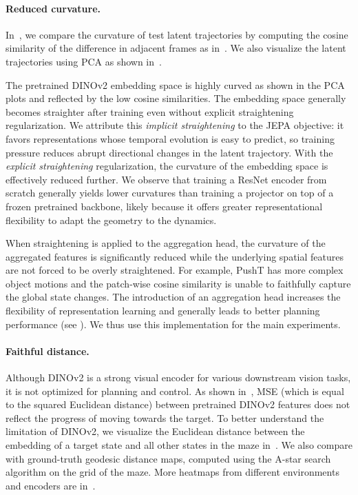 \paragraph{Reduced curvature.} In~, we compare the curvature of test latent trajectories by computing the cosine similarity of the difference in adjacent frames as in~. We also visualize the latent trajectories using PCA as shown in~. 

The pretrained DINOv2 embedding space is highly curved as shown in the PCA plots and reflected by the low cosine similarities. The embedding space generally becomes straighter after training even without explicit straightening regularization. We attribute this \emph{implicit straightening} to the JEPA objective: it favors representations whose temporal evolution is easy to predict, so training pressure reduces abrupt directional changes in the latent trajectory. With the \emph{explicit straightening} regularization, the curvature of the embedding space is effectively reduced further. We observe that training a ResNet encoder from scratch generally yields lower curvatures than training a projector on top of a frozen pretrained backbone, likely because it offers greater representational flexibility to adapt the geometry to the dynamics.

When straightening is applied to the aggregation head, the curvature of the aggregated features is significantly reduced while the underlying spatial features are not forced to be overly straightened. For example, PushT has more complex object motions and the patch-wise cosine similarity is unable to faithfully capture the global state changes. The introduction of an aggregation head increases the flexibility of representation learning and generally leads to better planning performance (see ). We thus use this implementation for the main experiments.

\paragraph{Faithful distance.} Although DINOv2 is a strong visual encoder for various downstream vision tasks, it is not optimized for planning and control. As shown in~, MSE (which is equal to the squared Euclidean distance) between pretrained DINOv2 features does not reflect the progress of moving towards the target. To better understand the limitation of DINOv2, we visualize the Euclidean distance between the embedding of a target state and all other states in the maze in~. We also compare with ground-truth geodesic distance maps, computed using the A-star search algorithm on the grid of the maze. More heatmaps from different environments and encoders are in~. 

